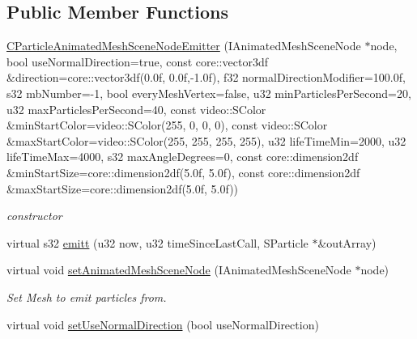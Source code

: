\subsection*{Public Member Functions}
\begin{DoxyCompactItemize}
\item 
\hypertarget{classirr_1_1scene_1_1_c_particle_animated_mesh_scene_node_emitter_a20b4d83bdd785999a17105f28fdf253e}{\hyperlink{classirr_1_1scene_1_1_c_particle_animated_mesh_scene_node_emitter_a20b4d83bdd785999a17105f28fdf253e}{C\-Particle\-Animated\-Mesh\-Scene\-Node\-Emitter} (I\-Animated\-Mesh\-Scene\-Node $\ast$node, bool use\-Normal\-Direction=true, const core\-::vector3df \&direction=core\-::vector3df(0.\-0f, 0.\-0f,-\/1.\-0f), f32 normal\-Direction\-Modifier=100.\-0f, s32 mb\-Number=-\/1, bool every\-Mesh\-Vertex=false, u32 min\-Particles\-Per\-Second=20, u32 max\-Particles\-Per\-Second=40, const video\-::\-S\-Color \&min\-Start\-Color=video\-::\-S\-Color(255, 0, 0, 0), const video\-::\-S\-Color \&max\-Start\-Color=video\-::\-S\-Color(255, 255, 255, 255), u32 life\-Time\-Min=2000, u32 life\-Time\-Max=4000, s32 max\-Angle\-Degrees=0, const core\-::dimension2df \&min\-Start\-Size=core\-::dimension2df(5.\-0f, 5.\-0f), const core\-::dimension2df \&max\-Start\-Size=core\-::dimension2df(5.\-0f, 5.\-0f))}\label{classirr_1_1scene_1_1_c_particle_animated_mesh_scene_node_emitter_a20b4d83bdd785999a17105f28fdf253e}

\begin{DoxyCompactList}\small\item\em constructor \end{DoxyCompactList}\item 
virtual s32 \hyperlink{classirr_1_1scene_1_1_c_particle_animated_mesh_scene_node_emitter_afc87ec589be7ade34f05ecbd055505a0}{emitt} (u32 now, u32 time\-Since\-Last\-Call, S\-Particle $\ast$\&out\-Array)
\item 
\hypertarget{classirr_1_1scene_1_1_c_particle_animated_mesh_scene_node_emitter_a1c2acb065a161b791f6dfa7bc9dfb41f}{virtual void \hyperlink{classirr_1_1scene_1_1_c_particle_animated_mesh_scene_node_emitter_a1c2acb065a161b791f6dfa7bc9dfb41f}{set\-Animated\-Mesh\-Scene\-Node} (I\-Animated\-Mesh\-Scene\-Node $\ast$node)}\label{classirr_1_1scene_1_1_c_particle_animated_mesh_scene_node_emitter_a1c2acb065a161b791f6dfa7bc9dfb41f}

\begin{DoxyCompactList}\small\item\em Set Mesh to emit particles from. \end{DoxyCompactList}\item 
\hypertarget{classirr_1_1scene_1_1_c_particle_animated_mesh_scene_node_emitter_a7f72a7cdf9864214364f91ebd2cf949e}{virtual void \hyperlink{classirr_1_1scene_1_1_c_particle_animated_mesh_scene_node_emitter_a7f72a7cdf9864214364f91ebd2cf949e}{set\-Use\-Normal\-Direction} (bool use\-Normal\-Direction)}\label{classirr_1_1scene_1_1_c_particle_animated_mesh_scene_node_emitter_a7f72a7cdf9864214364f91ebd2cf949e}


\end{DoxyCompactItemize}
